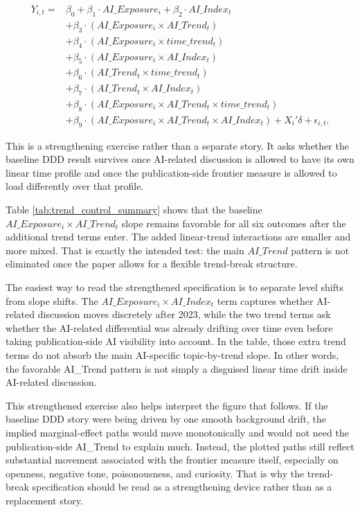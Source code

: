 \documentclass[11pt]{article}
\begin{document}
\begin{equation}
\begin{aligned}
Y_{i,t} ={}& \beta_0 + \beta_1 \cdot AI\_Exposure_i + \beta_2 \cdot AI\_Index_t \\
&+ \beta_3 \cdot \left(AI\_Exposure_i \times AI\_Trend_t\right) \\
&+ \beta_4 \cdot \left(AI\_Exposure_i \times time\_trend_t\right) \\
&+ \beta_5 \cdot \left(AI\_Exposure_i \times AI\_Index_t\right) \\
&+ \beta_6 \cdot \left(AI\_Trend_t \times time\_trend_t\right) \\
&+ \beta_7 \cdot \left(AI\_Trend_t \times AI\_Index_t\right) \\
&+ \beta_8 \cdot \left(AI\_Exposure_i \times AI\_Trend_t \times time\_trend_t\right) \\
&+ \beta_9 \cdot \left(AI\_Exposure_i \times AI\_Trend_t \times AI\_Index_t\right)
+ X_i' \delta + \epsilon_{i,t}.
\end{aligned}
\end{equation}

This is a strengthening exercise rather than a separate story. It asks whether the baseline DDD result survives once AI-related discussion is allowed to have its own linear time profile and once the publication-side frontier measure is allowed to load differently over that profile.

Table \ref{tab:trend_control_summary} shows that the baseline $AI\_Exposure_i \times AI\_Trend_t$ slope remains favorable for all six outcomes after the additional trend terms enter. The added linear-trend interactions are smaller and more mixed. That is exactly the intended test: the main $AI\_Trend$ pattern is not eliminated once the paper allows for a flexible trend-break structure.

The easiest way to read the strengthened specification is to separate level shifts from slope shifts. The $AI\_Exposure_i \times AI\_Index_t$ term captures whether AI-related discussion moves discretely after 2023, while the two trend terms ask whether the AI-related differential was already drifting over time even before taking publication-side AI visibility into account. In the table, those extra trend terms do not absorb the main AI-specific topic-by-trend slope. In other words, the favorable AI\_Trend pattern is not simply a disguised linear time drift inside AI-related discussion.

This strengthened exercise also helps interpret the figure that follows. If the baseline DDD story were being driven by one smooth background drift, the implied marginal-effect paths would move monotonically and would not need the publication-side AI\_Trend to explain much. Instead, the plotted paths still reflect substantial movement associated with the frontier measure itself, especially on openness, negative tone, poisonousness, and curiosity. That is why the trend-break specification should be read as a strengthening device rather than as a replacement story.
\end{document}
